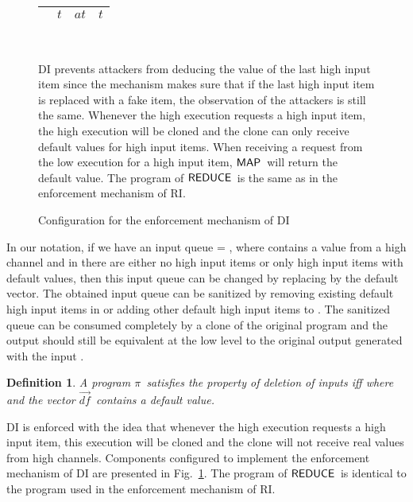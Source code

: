 \documentclass[10pt,a4paper,oneside]{article}
\newtheorem{definition}{Definition}[section]
\def\TPV{\ensuremath{T_{R}}}
\def\sanserif#1{\ensuremath{\sf #1}}
\def\REDUCE{\ensuremath{\sanserif{REDUCE}}}
\def\MAP{\ensuremath{\sanserif{MAP}}}
\def\defvec{\ensuremath{\vec{df}}}
\def\Prog{\ensuremath{\pi}}
\def\Progl#1{\ensuremath{\Prog[#1]}}
\def\tgetask{\ensuremath{at}}
\def\tget{\ensuremath{t}}
\def\tnoaction{\ensuremath{-}}
\def\ttellput{\ensuremath{at}}
\def\tindex#1{\ensuremath{\Progl{#1}}}
\def\figdesc#1{
\noindent
\centering
\begin{minipage}{0.95\columnwidth}
\vspace{3pt}
\begin{footnotesize}
#1
\end{footnotesize}
\end{minipage}
}
\begin{document}
\begin{figure}[!t]
{\begin{tabular}{|c|>{\centering\arraybackslash}p{13pt}|>{\centering\arraybackslash}p{13pt}|>{\centering\arraybackslash}p{34pt}|}
\hline
 & \tget & \tgetask & \tget\\
\hline
\end{tabular}
} \hfill
\subfloat[\TPV]{
\label{fig:table:DI:REDUCE}
\begin{tabular}{|c|>{\centering\arraybackslash}p{13pt}|>{\centering\arraybackslash}p{13pt}|>{\centering\arraybackslash}p{34pt}|}
\hline
~ &  \tindex{0} & \tindex{1} & \\
\hline
 & \ttellput & \tnoaction & \tnoaction \\
\hline
 & \tnoaction & \ttellput & \tnoaction \\
\hline
\end{tabular}
}\\
\figdesc{DI prevents attackers from deducing the value of the last high input item since the mechanism makes sure that if the last high input item is replaced with a fake item, the observation of the attackers is still the same. Whenever the high execution requests a high input item, the high execution will be cloned and the clone can only receive default values for high input items. When receiving a request from the low execution for a high input item, \MAP\ will return the default value. The program of \REDUCE\ is the same as in the enforcement mechanism of RI.}
\caption{Configuration for the enforcement mechanism of DI}
\label{fig:table:DI}
\end{figure}


In our notation, if we have an input queue  = , where  contains a value from a high channel and in  there are either no high input items or only high input items with default values, then this input queue can be changed by replacing  by the default vector. The obtained input queue can be sanitized by removing existing default high input items in  or adding other default high input items to . The sanitized queue can be consumed completely by a clone of the original program and the output should still be equivalent at the low level to the original output generated with the input .

\begin{definition}\label{def:DI}
A program \Prog ~satisfies the property of \emph{deletion of inputs}  iff
 where  and the vector \defvec\ contains a default value.
\end{definition}

DI is enforced with the idea that whenever the high execution requests a high input item, this execution will be cloned and the clone will not receive real values from high channels. Components configured to implement the enforcement mechanism of DI are presented in Fig.~\ref{fig:table:DI}. The program of \REDUCE\ is identical to the program used in the enforcement mechanism of RI.
\end{document}
